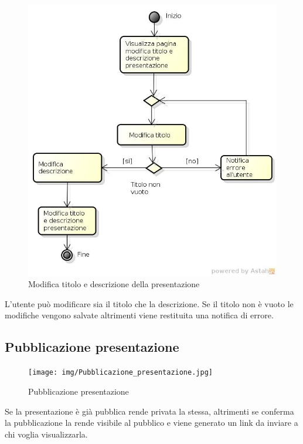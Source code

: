 \begin{figure}[h!]
		\centering
		\includegraphics[scale=.2]{img/Modifica_titolo_e_descrizione_presentazione.jpg}
		\caption{Modifica titolo e descrizione della presentazione}
		\label{fig:ModelloSpy}
\end{figure}

L'utente può modificare sia il titolo che la descrizione. Se il titolo non è vuoto le modifiche vengono salvate altrimenti viene restituita una notifica di errore.

\subsection{Pubblicazione presentazione}

\begin{figure}[h!]
		\centering
		\texttt{[image: img/Pubblicazione\_presentazione.jpg]}
		\caption{Pubblicazione presentazione}
		\label{fig:ModelloSpy}
\end{figure}

Se la presentazione è già pubblica rende privata la stessa, altrimenti se conferma la pubblicazione la rende visibile al pubblico e viene generato un link da inviare a chi voglia visualizzarla.

